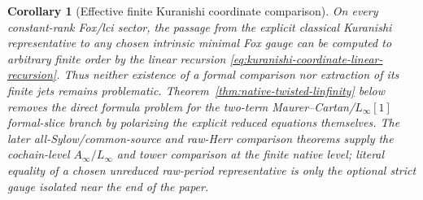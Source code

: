 \documentclass[11pt]{article}
\newtheorem{corollary}[theorem]{Corollary}
\theoremstyle{definition}
\begin{document}
\begin{corollary}[Effective finite Kuranishi coordinate comparison]\label{cor:kuranishi-coordinate-gap-finite}
On every constant-rank Fox/lci sector, the passage from the explicit classical
Kuranishi representative to any chosen intrinsic minimal Fox gauge can be
computed to arbitrary finite order by the linear recursion
\eqref{eq:kuranishi-coordinate-linear-recursion}.  Thus neither existence of a formal comparison nor extraction of its finite
jets remains problematic.  Theorem~\ref{thm:native-twisted-linfinity} below
removes the direct formula problem for the two-term Maurer--Cartan/$L_\infty[1]$
formal-slice branch by polarizing the explicit reduced equations themselves.
The later all-Sylow/common-source and raw-Herr comparison theorems supply the
cochain-level $A_\infty/L_\infty$ and tower comparison at the finite native
level; literal equality of a chosen unreduced raw-period representative is
only the optional strict gauge isolated near the end of the paper.
\end{corollary}
\end{document}
